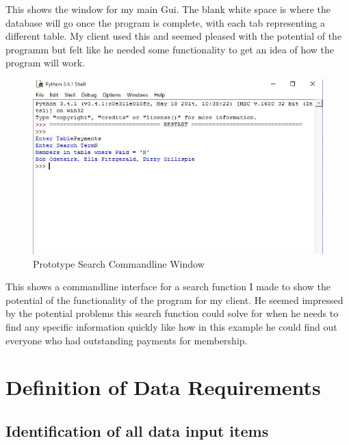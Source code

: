 This shows the window for my main Gui. The blank white space is where the database will go once the program is complete, with each tab representing a different table. My client used this and seemed pleased with the potential of the programm but felt like he needed some functionality to get an idea of how the program will work.

\begin{figure}[H]
    \includegraphics[width=\textwidth]{PrototypeGui2.JPG}
    \caption{Prototype Search Commandline Window} \label{fig:Prototype Search Commandline Window}
\end{figure}

This shows a commandline interface for a search function I made to show the potential of the functionality of the program for my client. He seemed impressed by the potential problems this search function could solve for when he needs to find any specific information quickly like how in this example he could find out everyone who had outstanding payments for membership.

\section{Definition of Data Requirements}

\subsection{Identification of all data input items}

